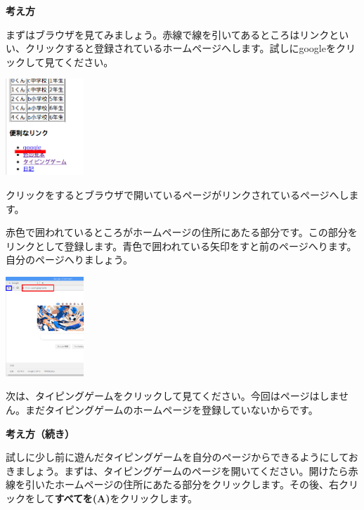 \documentclass[a4paper,12pt]{jarticle}
\begin{document}
\flushleft

\textbf{考え方}



まずはブラウザを見てみましょう。赤線で線を引いてあるところはリンクといい、クリックすると登録されているホームページへします。試しにgoogleをクリックして見てください。


\bigskip

\centering
\includegraphics[width=0.22\textwidth]{textbook-img194.png}


\flushleft

\bigskip

クリックをするとブラウザで開いているページがリンクされているページへします。

赤色で囲われているところがホームページの住所にあたる部分です。この部分をリンクとして登録します。青色で囲われている矢印をすと前のページへります。自分のページへりましょう。



\bigskip

\centering
\includegraphics[width=0.22\textwidth]{textbook-img195.png}

\bigskip

\flushleft
次は、タイピングゲームをクリックして見てください。今回はページはしません。まだタイピングゲームのホームページを登録していないからです。


\clearpage
\textbf{考え方（続き）}



試しに少し前に遊んだタイピングゲームを自分のページからできるようにしておきましょう。まずは、タイピングゲームのページを開いてください。開けたら赤線を引いたホームページの住所にあたる部分をクリックします。その後、右クリックをして\textbf{すべてを(A)}をクリックします。
\end{document}
